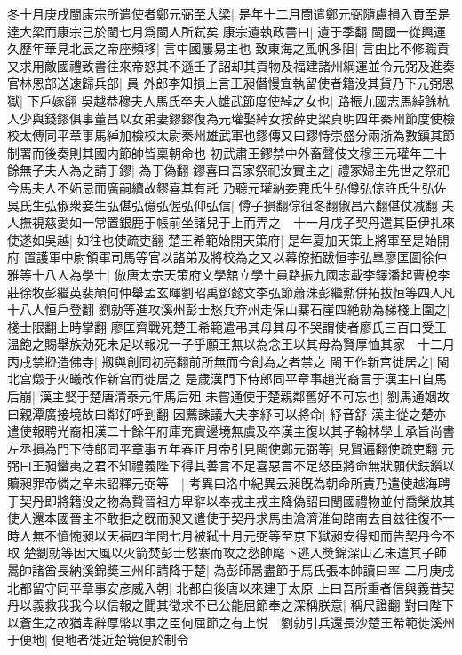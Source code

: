 冬十月庚戌閩康宗所遣使者鄭元弼至大梁|{
	是年十二月閩遣鄭元弼隨盧損入貢至是逹大梁而康宗己於閩七月爲閩人所弑矣}
康宗遺執政書曰|{
	遺于季翻}
閩國一從興運久歷年華見北辰之帝座頻移|{
	言中國屢易主也}
致東海之風帆多阻|{
	言由比不修職貢}
又求用敵國禮致書往來帝怒其不遜壬子詔却其貢物及福建諸州綱運並令元弼及進奏官林恩部送速歸兵部|{
	員}
外郎李知損上言王昶僭慢宜執留使者籍没其貨乃下元弼恩獄|{
	下戶嫁翻}
吳越恭穆夫人馬氏卒夫人雄武節度使綽之女也|{
	路振九國志馬綽餘杭人少與錢鏐俱事董昌以女弟妻鏐鏐復為元瓘娶綽女按薛史梁貞明四年秦州節度使檢校太傅同平章事馬綽加檢校太尉秦州雄武軍也鏐傳又曰鏐恃崇盛分兩浙為數鎮其節制署而後奏則其國内節帥皆稟朝命也}
初武肅王鏐禁中外畜聲伎文穆王元瓘年三十餘無子夫人為之請于鏐|{
	為于偽翻}
鏐喜曰吾家祭祀汝實主之|{
	禮冢婦主先世之祭祀今馬夫人不妬忌而廣嗣續故鏐喜其有託}
乃聽元瓘納妾鹿氏生弘僔弘倧許氏生弘佐吳氏生弘俶衆妾生弘偡弘億弘偓弘仰弘信|{
	僔子損翻倧徂冬翻俶昌六翻偡仗减翻}
夫人撫視慈愛如一常置銀鹿于帳前坐諸兒于上而弄之　十一月戊子契丹遣其臣伊扎來使遂如吳越|{
	如往也使疏吏翻}
楚王希範始開天策府|{
	是年夏加天策上將軍至是始開府}
置護軍中尉領軍司馬等官以諸弟及將校為之又以幕僚拓跋恒李弘臯廖匡圖徐仲雅等十八人為學士|{
	倣唐太宗天策府文學舘立學士員路振九國志載李鐸潘起曹梲李莊徐牧彭繼英裴頏何仲舉孟玄暉劉昭禹鄧懿文李弘節蕭洙彭繼勲併拓拔恒等四人凡十八人恒戶登翻}
劉勍等進攻溪州彭士愁兵弃州走保山寨石崖四絶勍為梯棧上圍之|{
	棧士限翻上時掌翻}
廖匡齊戰死楚王希範遣弔其母其母不哭謂使者廖氏三百口受王温飽之賜舉族効死未足以報况一子乎願王無以為念王以其母為賢厚恤其家　十二月丙戌禁剙造佛寺|{
	剏與創同初亮翻前所無而今創為之者禁之}
閩王作新宫徙居之|{
	閩北宫燬于火曦改作新宫而徙居之}
是歲漢門下侍郎同平章事趙光裔言于漢主曰自馬后崩|{
	漢主娶于楚唐清泰元年馬后殂}
未嘗通使于楚親鄰舊好不可忘也|{
	劉馬通姻故曰親潭廣接境故曰鄰好呼到翻}
因薦諫議大夫李紓可以將命|{
	紓音舒}
漢主從之楚亦遣使報聘光裔相漢二十餘年府庫充實邊境無虞及卒漢主復以其子翰林學士承旨尚書左丞損為門下侍郎同平章事五年春正月帝引見閩使鄭元弼等|{
	見賢遍翻使疏吏翻}
元弼曰王昶蠻夷之君不知禮義陛下得其善言不足喜惡言不足怒臣將命無狀願伏鈇鑕以贖昶罪帝憐之辛未詔釋元弼等　|{
	考異曰洛中紀異云昶旣為朝命所責乃遣使越海聘于契丹即將籍没之物為贄晉祖方卑辭以奉戎主戎主降偽詔曰閩國禮物並付喬榮放其使人還本國晉主不敢拒之旣而昶又遣使于契丹求馬由滄濟淮甸路南去自兹往復不一時人無不憤惋昶以天福四年閏七月被弑十月元弼等至京下獄昶安得知而告契丹今不取}
楚劉勍等因大風以火箭焚彭士愁寨而攻之愁帥麾下逃入奬錦深山乙未遣其子師暠帥諸酋長納溪錦奬三州印請降于楚|{
	為彭師暠盡節于馬氏張本帥讀曰率}
二月庚戌北都留守同平章事安彦威入朝|{
	北都自後唐以來建于太原}
上曰吾所重者信與義昔契丹以義救我我今以信報之聞其徵求不已公能屈節奉之深稱朕意|{
	稱尺證翻}
對曰陛下以蒼生之故猶卑辭厚幣以事之臣何屈節之有上悦　劉勍引兵還長沙楚王希範徙溪州于便地|{
	便地者徙近楚境便於制令}
